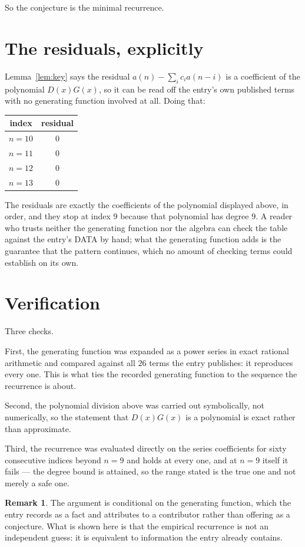 \documentclass[11pt,a4paper]{article}
\theoremstyle{plain}
\theoremstyle{definition}
\newtheorem{remark}[theorem]{Remark}
\begin{document}
So the conjecture is the minimal recurrence.

\section{The residuals, explicitly}

Lemma~\ref{lem:key} says the residual $a(n)-\sum_ic_ia(n-i)$ is a coefficient of the
polynomial $D(x)G(x)$, so it can be read off the entry's own published terms with no
generating function involved at all. Doing that:
\begin{center}
\begin{tabular}{cc}
index & residual \\ \hline
$n=10$ & $0$ \\
$n=11$ & $0$ \\
$n=12$ & $0$ \\
$n=13$ & $0$
\end{tabular}
\end{center}
The residuals are exactly the coefficients of the polynomial displayed above, in order, and
they stop at index $9$ because that polynomial has degree $9$. A reader who trusts
neither the generating function nor the algebra can check the table against the entry's DATA
by hand; what the generating function adds is the guarantee that the pattern continues, which
no amount of checking terms could establish on its own.

\section{Verification}

Three checks.

First, the generating function was expanded as a power series in exact rational arithmetic and
compared against all $26$ terms the entry publishes: it reproduces every one. This is
what ties the recorded generating function to the sequence the recurrence is about.

Second, the polynomial division above was carried out symbolically, not numerically, so the
statement that $D(x)G(x)$ is a polynomial is exact rather than approximate.

Third, the recurrence was evaluated directly on the series coefficients for sixty consecutive
indices beyond $n=9$ and holds at every one, and at $n=9$ itself it fails --- the
degree bound is attained, so the range stated is the true one and not merely a safe one.

\begin{remark}
The argument is conditional on the generating function, which the entry records as a fact and
attributes to a contributor rather than offering as a conjecture. What is shown here is that
the empirical recurrence is not an independent guess: it is equivalent to information the
entry already contains.
\end{remark}
\end{document}
